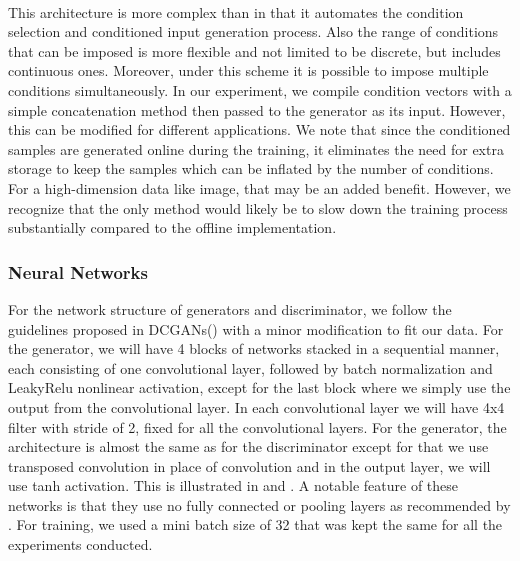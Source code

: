 \documentclass[11pt, letterpaper, oneside]{article}
\begin{document}
\paragraph{}
This architecture is more complex than \cite{chen_self-supervised_2019} in that it automates the condition selection and conditioned input generation process. Also the range of conditions that can be imposed is more flexible and not limited to be discrete, but includes continuous ones. Moreover, under this scheme it is possible to impose multiple conditions simultaneously. In our experiment, we compile condition vectors with a simple concatenation method then passed to the generator as its input. However, this can be modified for different applications. We note that since the conditioned samples are generated online during the training, it eliminates the need for extra storage to keep the samples which can be inflated by the number of conditions. For a high-dimension data like image, that may be an added benefit. However, we recognize that the only method would likely be to slow down the training process substantially compared to the offline implementation. 

\subsubsection{Neural Networks}
For the network structure of generators and discriminator, we follow the guidelines proposed in DCGANs(\cite{radford_unsupervised_2016})  with a minor modification to fit our data. For the generator, we will have 4 blocks of networks stacked in a sequential manner, each consisting of one convolutional layer, followed by batch normalization and LeakyRelu nonlinear activation, except for the last block where we simply use the output from the convolutional layer. In each convolutional layer we will have 4x4 filter with stride of 2, fixed for all the convolutional layers. For the generator, the architecture is almost the same as for the discriminator except for that we use transposed convolution in place of convolution and in the output layer, we will use tanh activation. This is illustrated in  and . 
A notable feature of these networks is that they use no fully connected or pooling layers as recommended by \cite{radford_unsupervised_2016}. For training, we used a mini batch size of 32 that was kept the same for all the experiments conducted. 

\end{document}
